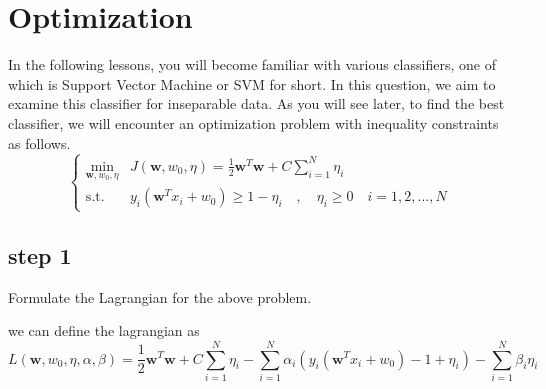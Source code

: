 \section{Optimization}
In the following lessons, you will become familiar with various classifiers, one of which is Support Vector Machine or SVM for short. In this question, we aim to examine this classifier for inseparable data. As you will see later, to find the best classifier, we will encounter an optimization problem with inequality constraints as follows.
\[
\left\{
\begin{array}{ll}
\min\limits_{\textbf{w},w_0,\eta} & J(\textbf{w},w_0,\eta) = \frac{1}{2}\textbf{w}^T\textbf{w} + C \sum\limits_{i=1}^{N} \eta_i \\
\text{s.t.} & y_i(\textbf{w}^Tx_i + w_0) \geq 1 - \eta_i\quad ,\quad \eta_i \geq 0 \quad i = 1,2,...,N
\end{array}
\right.
\]
\subsection{step 1}
Formulate the Lagrangian for the above problem.
\begin{qsolve}
	\begin{qsolve}[]
		we can define the lagrangian as
		$$ L(\textbf{w},w_0,\eta,\alpha,\beta) = \frac{1}{2}\textbf{w}^T\textbf{w} + C \sum\limits_{i=1}^{N} \eta_i - \sum\limits_{i=1}^{N}\alpha_i(y_i(\textbf{w}^Tx_i + w_0) - 1 + \eta_i) - \sum\limits_{i=1}^{N}\beta_i\eta_i $$
		
	\end{qsolve}
\end{qsolve}

